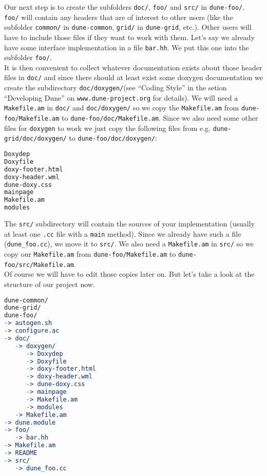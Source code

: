 \documentclass[11pt,a4paper,headinclude,footinclude,DIV16,normalheadings]{scrartcl}
\newcommand{\makefileam}{\texttt{Makefile.am}\xspace}
\newcommand{\dunecommon}{\texttt{dune-common}\xspace}
\newcommand{\dunegrid}{\texttt{dune-grid}\xspace}
\begin{document}
Our next step is to create the subfolders \texttt{doc/}\xspace,
\texttt{foo/}\xspace and \texttt{src/}\xspace in \texttt{dune-foo/}\xspace.\\
\texttt{foo/}\xspace will contain any headers that are of interest to other
users (like the subfolder \texttt{common/}\xspace in
\dunecommon, \texttt{grid/}\xspace in \dunegrid, etc.). Other users will have to
include those files if they want to work with them. Let's say we already have some interface implementation
in a file \texttt{bar.hh}\xspace. We put this one into the subfolder
\texttt{foo/}\xspace.\\
It is then convenient to collect whatever documentation exists about those
header files in \texttt{doc/}\xspace and since there should
at least exist some doxygen documentation we create the
subdirectory \texttt{doc/doxygen/}\xspace (see ``Coding Style'' in the
setion ``Developing Dune'' on \texttt{www.dune-project.org} for details).
We will need a \makefileam in
\texttt{doc/}\xspace and \texttt{doc/doxygen/}\xspace so we copy the
\makefileam from \texttt{dune-foo/Makefile.am}\xspace to
\texttt{dune-foo/doc/Makefile.am}. Since we also need
some other files for \texttt{doxygen}\xspace to work we just copy the
following files from e.g. \texttt{dune-grid/doc/doxygen/}\xspace to
\texttt{dune-foo/doc/doxygen/}\xspace:

\begin{lstlisting}[language=make]
Doxydep
Doxyfile
doxy-footer.html
doxy-header.wml
dune-doxy.css
mainpage
Makefile.am
modules
\end{lstlisting}

The \texttt{src/}\xspace subdirectory will contain the sources of your
implementation (usually at least one \texttt{.cc}\xspace file with a
\texttt{main} method). Since we already have such a file
(\texttt{dune\_foo.cc}), we move it to \texttt{src/}\xspace. We also need
a \makefileam in \texttt{src/}\xspace so we copy our \makefileam from
\texttt{dune-foo/Makefile.am}\xspace to
\texttt{dune-foo/src/Makefile.am}\xspace.\\
Of course we will have to edit those copies later on. But let's take a
look at the structure of our project now.

\begin{lstlisting}[language=make]
dune-common/
dune-grid/
dune-foo/
-> autogen.sh
-> configure.ac
-> doc/
   -> doxygen/
      -> Doxydep
      -> Doxyfile
      -> doxy-footer.html
      -> doxy-header.wml
      -> dune-doxy.css
      -> mainpage
      -> Makefile.am
      -> modules
   -> Makefile.am
-> dune.module
-> foo/
   -> bar.hh
-> Makefile.am
-> README
-> src/
   -> dune_foo.cc
\end{lstlisting}
\end{document}
